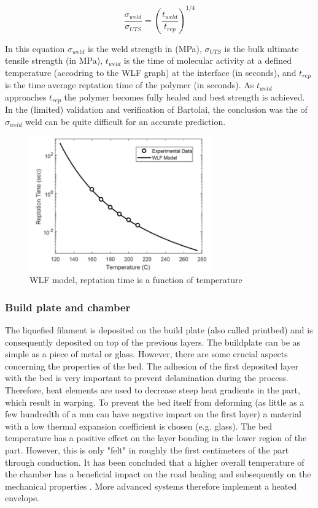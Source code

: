 \begin{equation} \label{eq:weld}
\frac{\sigma_{weld}}{\sigma_{UTS}}=\left(\frac{t_{weld}}{t_{rep}}\right)^{1/4}
\end{equation}

In this equation $\sigma_{weld}$ is the weld strength in (MPa), $\sigma_{UTS}$ is the bulk ultimate tensile strength (in MPa), $t_{weld}$ is the time of molecular activity at a defined temperature (accodring to the WLF graph) at the interface (in seconds), and $t_{rep}$ is the time average reptation time of the polymer (in seconds). As $t_{weld}$ approaches $t_{rep}$ the polymer becomes fully healed and best strength is achieved. In the (limited) validation and verification of Bartolai, the conclusion was the of $\sigma_{weld}$ weld can be quite difficult for an accurate prediction.

\begin{figure}[htb]
    \centering
    \includegraphics[width=0.70\textwidth]{chapter_2/figures/WLFreptation.PNG}
    \caption{WLF model, reptation time is a function of temperature \cite{Seppala2017WeldManufacturing}}
    \label{fig:WLFreptation}
\end{figure}

\subsubsection{Build plate and chamber}
    \label{Build plate and chamber}
The liquefied filament is deposited on the build plate (also called printbed) and is consequently deposited on top of the previous layers. The buildplate can be as simple as a piece of metal or glass. However, there are some crucial aspects concerning the properties of the bed. The adhesion of the first deposited layer with the bed is very important to prevent delamination during the process. Therefore, heat elements are used to decrease steep heat gradients in the part, which result in warping. To prevent the bed itself from deforming (as little as a few hundredth of a mm can have negative impact on the first layer) a material with a low thermal expansion coefficient is chosen (e.g. glass). The bed temperature has a positive effect on the layer bonding in the lower region of the part. However, this is only "felt" in roughly the first centimeters of the part through conduction. It has been concluded that a higher overall temperature of the chamber has a beneficial impact on the road healing and subsequently on the mechanical properties \cite{Veen2019EnhancingTemperature}. More advanced systems therefore implement a heated envelope.

